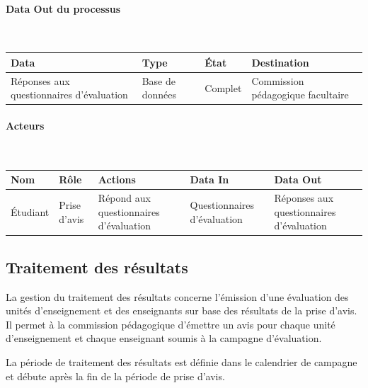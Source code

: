 \documentclass[a4paper,11pt]{report}
\begin{document}
\paragraph{Data Out du processus}~\newline{}

\begin{tabularx}{\linewidth}{|X|X|X|X|} \hline
Data & Type & État & Destination \\ \hline
Réponses aux questionnaires d'évaluation & Base de données & Complet & Commission pédagogique facultaire \\ \hline
\end{tabularx}

\paragraph{Acteurs}~\newline{}

\begin{tabularx}{\linewidth}{|X|X|X|X|X|} \hline
Nom & Rôle & Actions & Data In & Data Out \\ \hline 
Étudiant & Prise d'avis & Répond aux questionnaires d'évaluation & Questionnaires d'évaluation & Réponses aux questionnaires d'évaluation \\ \hline
\end{tabularx}






\subsection{Traitement des résultats}
La gestion du traitement des résultats concerne l'émission d'une évaluation des unités d'enseignement et des enseignants sur base des résultats de la prise d'avis.
Il permet à la commission pédagogique d'émettre un avis pour chaque unité d'enseignement et chaque enseignant soumis à la campagne d'évaluation.

La période de traitement des résultats est définie dans le calendrier de campagne et débute après la fin de la période de prise d'avis.
\end{document}
